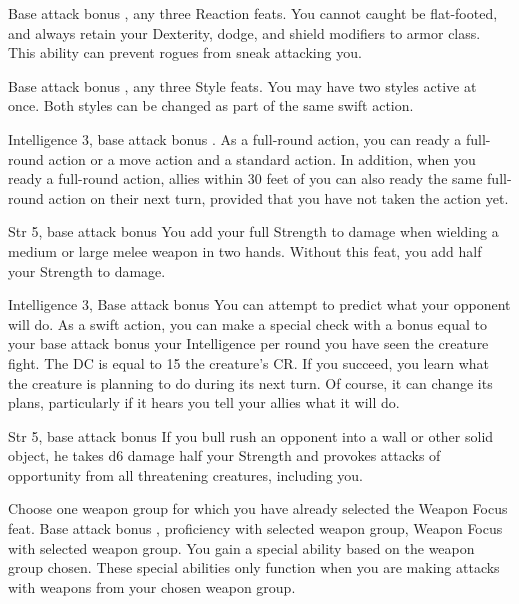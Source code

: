 \featpre Base attack bonus , any three Reaction feats.
\featben You cannot caught be flat-footed, and always retain your Dexterity, dodge, and shield modifiers to armor class. This ability can prevent rogues from sneak attacking you.

\featpre Base attack bonus , any three Style feats.
\featben You may have two styles active at once. Both styles can be changed as part of the same swift action.

\featpre Intelligence 3, base attack bonus .
\featben As a full-round action, you can ready a full-round action or a move action and a standard action. In addition, when you ready a full-round action, allies within 30 feet of you can also ready the same full-round action on their next turn, provided that you have not taken the action yet.

 Str 5, base attack bonus 
 You add your full Strength to damage when wielding a medium or large melee weapon in two hands.
 Without this feat, you add half your Strength to damage.

 Intelligence 3, Base attack bonus 
 You can attempt to predict what your opponent will do. As a swift action, you can make a special check with a bonus equal to your base attack bonus \add your Intelligence  per round you have seen the creature fight. The DC is equal to 15 \add the creature's CR. If you succeed, you learn what the creature is planning to do during its next turn. Of course, it can change its plans, particularly if it hears you tell your allies what it will do.

\featpre Str 5, base attack bonus 
\featben If you bull rush an opponent into a wall or other solid object, he takes d6 damage \add half your Strength and provokes attacks of opportunity from all threatening creatures, including you.

Choose one weapon group for which you have already selected the Weapon Focus feat.
 Base attack bonus , proficiency with selected weapon group, Weapon Focus with selected weapon group.
\featben You gain a special ability based on the weapon group chosen. These special abilities only function when you are making attacks with weapons from your chosen weapon group.

